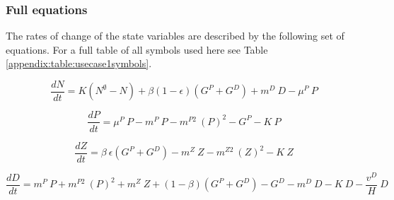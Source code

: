 \documentclass[template.tex]{subfiles}
\begin{document}
\subsubsection{Full equations}
The rates of change of the state variables are described by the following set of equations. For a full table of all symbols used here see Table \ref{appendix:table:usecase1symbols}.

\begin{equation}
    \frac{d N}{d t} = 
    K (N^\emptyset - N) %
    + \beta(1 - \epsilon)(G^P + G^D) %
    + m^D \ D %
    - \mu^{P} \ P %
\end{equation}

\begin{equation}
    \frac{d P}{d t} =
    \mu^{P} \ P  %
    - m^P \ P %
    - m^{P2} \ (P)^2 %
    - G^P %
    - K \ P %
\end{equation}

\begin{equation}
    \frac{d Z}{d t} =
    \beta \ \epsilon(G^P + G^D) %
    - m^Z \ Z %
    - m^{Z2} \ (Z)^2 %
    - K \ Z %
\end{equation}

\begin{equation}
    \frac{d D}{d t} = 
    m^P \ P %
    + m^{P2} \ (P)^2 %
    + m^Z \ Z %
    + (1 - \beta)(G^P + G^D) %
    - G^D %
    - m^D \ D %
    - K \ D %
    - \frac{v^D}{H} \ D %
\end{equation}



\clearpage
\end{document}
